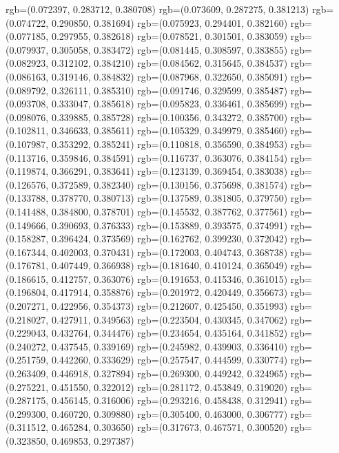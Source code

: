 {{{					rgb=(0.072397, 0.283712, 0.380708)
					rgb=(0.073609, 0.287275, 0.381213)
					rgb=(0.074722, 0.290850, 0.381694)
					rgb=(0.075923, 0.294401, 0.382160)
					rgb=(0.077185, 0.297955, 0.382618)
					rgb=(0.078521, 0.301501, 0.383059)
					rgb=(0.079937, 0.305058, 0.383472)
					rgb=(0.081445, 0.308597, 0.383855)
					rgb=(0.082923, 0.312102, 0.384210)
					rgb=(0.084562, 0.315645, 0.384537)
					rgb=(0.086163, 0.319146, 0.384832)
					rgb=(0.087968, 0.322650, 0.385091)
					rgb=(0.089792, 0.326111, 0.385310)
					rgb=(0.091746, 0.329599, 0.385487)
					rgb=(0.093708, 0.333047, 0.385618)
					rgb=(0.095823, 0.336461, 0.385699)
					rgb=(0.098076, 0.339885, 0.385728)
					rgb=(0.100356, 0.343272, 0.385700)
					rgb=(0.102811, 0.346633, 0.385611)
					rgb=(0.105329, 0.349979, 0.385460)
					rgb=(0.107987, 0.353292, 0.385241)
					rgb=(0.110818, 0.356590, 0.384953)
					rgb=(0.113716, 0.359846, 0.384591)
					rgb=(0.116737, 0.363076, 0.384154)
					rgb=(0.119874, 0.366291, 0.383641)
					rgb=(0.123139, 0.369454, 0.383038)
					rgb=(0.126576, 0.372589, 0.382340)
					rgb=(0.130156, 0.375698, 0.381574)
					rgb=(0.133788, 0.378770, 0.380713)
					rgb=(0.137589, 0.381805, 0.379750)
					rgb=(0.141488, 0.384800, 0.378701)
					rgb=(0.145532, 0.387762, 0.377561)
					rgb=(0.149666, 0.390693, 0.376333)
					rgb=(0.153889, 0.393575, 0.374991)
					rgb=(0.158287, 0.396424, 0.373569)
					rgb=(0.162762, 0.399230, 0.372042)
					rgb=(0.167344, 0.402003, 0.370431)
					rgb=(0.172003, 0.404743, 0.368738)
					rgb=(0.176781, 0.407449, 0.366938)
					rgb=(0.181640, 0.410124, 0.365049)
					rgb=(0.186615, 0.412757, 0.363076)
					rgb=(0.191653, 0.415346, 0.361015)
					rgb=(0.196804, 0.417914, 0.358876)
					rgb=(0.201972, 0.420449, 0.356673)
					rgb=(0.207271, 0.422956, 0.354373)
					rgb=(0.212607, 0.425450, 0.351993)
					rgb=(0.218027, 0.427911, 0.349563)
					rgb=(0.223504, 0.430345, 0.347062)
					rgb=(0.229043, 0.432764, 0.344476)
					rgb=(0.234654, 0.435164, 0.341852)
					rgb=(0.240272, 0.437545, 0.339169)
					rgb=(0.245982, 0.439903, 0.336410)
					rgb=(0.251759, 0.442260, 0.333629)
					rgb=(0.257547, 0.444599, 0.330774)
					rgb=(0.263409, 0.446918, 0.327894)
					rgb=(0.269300, 0.449242, 0.324965)
					rgb=(0.275221, 0.451550, 0.322012)
					rgb=(0.281172, 0.453849, 0.319020)
					rgb=(0.287175, 0.456145, 0.316006)
					rgb=(0.293216, 0.458438, 0.312941)
					rgb=(0.299300, 0.460720, 0.309880)
					rgb=(0.305400, 0.463000, 0.306777)
					rgb=(0.311512, 0.465284, 0.303650)
					rgb=(0.317673, 0.467571, 0.300520)
					rgb=(0.323850, 0.469853, 0.297387)
}}}
